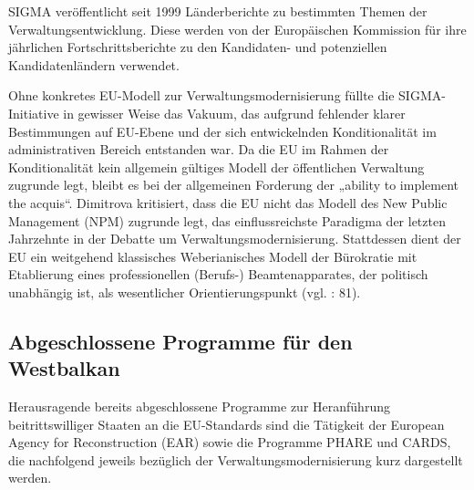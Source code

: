 SIGMA veröffentlicht seit 1999 Länderberichte zu bestimmten Themen der Verwaltungsentwicklung. Diese werden von der Europäischen Kommission für ihre jährlichen Fortschrittsberichte zu den Kandidaten- und potenziellen Kandidatenländern verwendet.\par
Ohne konkretes EU-Modell zur Verwaltungsmodernisierung füllte die SIGMA-Initiative in gewisser Weise das Vakuum, das aufgrund fehlender klarer Bestimmungen auf EU-Ebene und der sich entwickelnden Konditionalität im administrativen Bereich entstanden war. Da die EU im Rahmen der Konditionalität kein allgemein gültiges Modell der öffentlichen Verwaltung zugrunde legt, bleibt es bei der allgemeinen Forderung der „ability to implement the acquis“. Dimitrova kritisiert, dass die EU nicht das Modell des New Public Management (NPM) zugrunde legt, das einflussreichste Paradigma der letzten Jahrzehnte in der Debatte um Verwaltungsmodernisierung. Stattdessen dient der EU ein weitgehend klassisches Weberianisches Modell der Bürokratie mit Etablierung eines professionellen (Berufs-) Beamtenapparates, der politisch unabhängig ist, als wesentlicher Orientierungspunkt (vgl. \cite{dimit05} : 81).

\subsection{Abgeschlossene Programme für den Westbalkan}
Herausragende bereits abgeschlossene Programme zur Heranführung beitrittswilliger Staaten an die EU-Standards sind die Tätigkeit der European Agency for Reconstruction (EAR) sowie die Programme PHARE und CARDS, die nachfolgend jeweils bezüglich der Verwaltungsmodernisierung kurz dargestellt werden.

